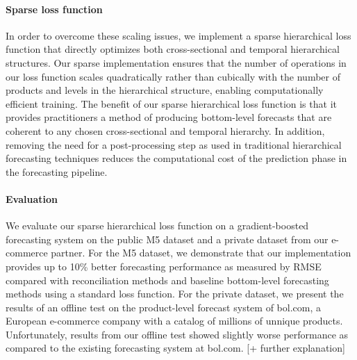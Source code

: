 \documentclass[preprint, 3p, times, twocolumn]{elsarticle}
\begin{document}
\paragraph{Sparse loss function} In order to overcome these scaling issues, we implement a sparse hierarchical loss function that directly optimizes both cross-sectional and temporal hierarchical structures. Our sparse implementation ensures that the number of operations in our loss function scales quadratically rather than cubically with the number of products and levels in the hierarchical structure, enabling computationally efficient training. The benefit of our sparse hierarchical loss function is that it provides practitioners a method of producing bottom-level forecasts that are coherent to any chosen cross-sectional and temporal hierarchy. In addition, removing the need for a post-processing step as used in traditional hierarchical forecasting techniques reduces the computational cost of the prediction phase in the forecasting pipeline.

\paragraph{Evaluation} We evaluate our sparse hierarchical loss function on a gradient-boosted forecasting system on the public M5 dataset \cite{makridakis_m5_2022} and a private dataset from our e-commerce partner. For the M5 dataset, we demonstrate that our implementation provides up to 10\% better forecasting performance as measured by RMSE compared with reconciliation methods and baseline bottom-level forecasting methods using a standard loss function. For the private dataset, we present the results of an offline test on the product-level forecast system of bol.com, a European e-commerce company with a catalog of millions of unnique products. Unfortunately, results from our offline test showed slightly worse performance as compared to the existing forecasting system at bol.com. [+ further explanation]
\end{document}
